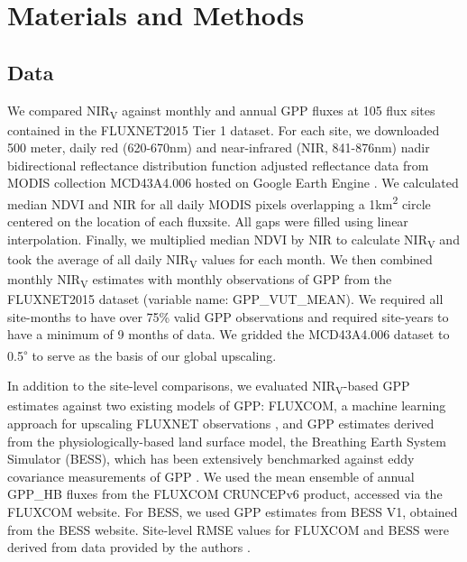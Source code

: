 \documentclass[10pt,letterpaper]{article}
\begin{document}
\section*{Materials and Methods}
\subsection*{Data}
We compared NIR\textsubscript{V} against monthly and annual GPP fluxes at 105 flux sites contained in the FLUXNET2015  Tier 1 dataset. For each site, we downloaded 500 meter, daily red (620-670nm) and near-infrared (NIR, 841-876nm) nadir bidirectional reflectance distribution function adjusted reflectance data from MODIS collection MCD43A4.006  hosted on Google Earth Engine \cite{MODISv6}. We calculated median NDVI and NIR for all daily MODIS pixels overlapping a 1km\textsuperscript{2} circle centered on the location of each fluxsite. All gaps were filled using linear interpolation. Finally, we multiplied median NDVI by NIR to calculate NIR\textsubscript{V} and took the average of all daily NIR\textsubscript{V} values for each month. We then combined monthly NIR\textsubscript{V} estimates with monthly observations of GPP from the FLUXNET2015 dataset (variable name: GPP\_VUT\_MEAN). We required all site-months to have over 75\% valid GPP observations and required site-years to have a minimum of 9 months of data. We gridded the MCD43A4.006 dataset to 0.5\textsuperscript{$\circ$} to serve as the basis of our global upscaling.

In addition to the site-level comparisons, we evaluated NIR\textsubscript{V}-based GPP estimates against two existing models of GPP: FLUXCOM, a machine learning approach for upscaling FLUXNET observations \cite{tramontana2016predicting}, and GPP estimates derived from the physiologically-based land surface  model, the Breathing Earth System Simulator (BESS), which has been extensively benchmarked against eddy covariance measurements of GPP \cite{ryu2011, jiang2016multi}. We used the mean ensemble of annual GPP\_HB fluxes from the FLUXCOM CRUNCEPv6 product, accessed via the FLUXCOM website. For BESS, we used GPP estimates from BESS V1, obtained from the BESS website. Site-level RMSE values for FLUXCOM and BESS were derived from data provided by the authors \cite{tramontana2016predicting, jiang2016multi}.
\end{document}
